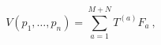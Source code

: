 \begin{equation}
V(p_1, \ldots , p_n) =
\sum\limits_{a=1}^{M+N} T^{(a)} F_a\ ,
\label{1.2}
\end{equation}

